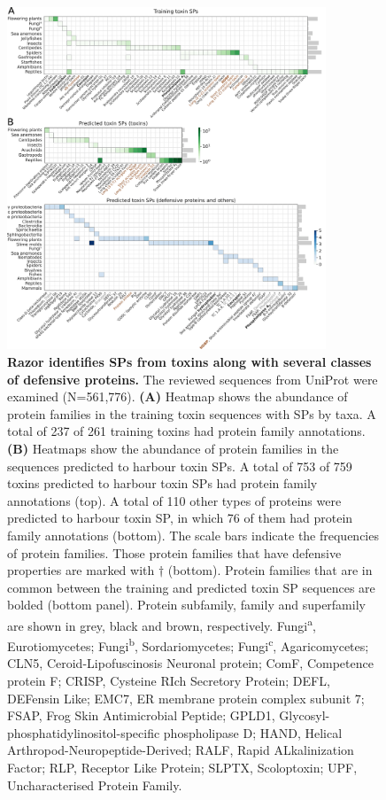 \begin{figure}[!hbtp]
\centerline{\includegraphics[width=0.85\textwidth]{chapters/Signal_Peptide/Figures/fig4_tox.png}}
\caption[Razor identifies SPs from toxins along with several classes of defensive proteins.]{\textbf{Razor identifies SPs from toxins along with several classes of defensive proteins.} The reviewed sequences from UniProt were examined (N=561,776). \textbf{(A)} Heatmap shows the abundance of protein families in the training toxin sequences with SPs by taxa. A total of 237 of 261 training toxins had protein family annotations. \textbf{(B)} Heatmaps show the abundance of protein families in the sequences predicted to harbour toxin SPs. A total of 753 of 759 toxins predicted to harbour toxin SPs had protein family annotations (top). A total of 110 other types of proteins were predicted to harbour toxin SP, in which 76 of them had protein family annotations (bottom). The scale bars indicate the frequencies of protein families. Those protein families that have defensive properties are marked with $\dagger$ (bottom). Protein families that are in common between the training and predicted toxin SP sequences are bolded (bottom panel). Protein subfamily, family and superfamily are shown in grey, black and brown, respectively. Fungi\textsuperscript{a}, Eurotiomycetes; Fungi\textsuperscript{b}, Sordariomycetes; Fungi\textsuperscript{c}, Agaricomycetes; CLN5, Ceroid-Lipofuscinosis Neuronal protein; ComF, Competence protein F; CRISP, Cysteine RIch Secretory Protein; DEFL, DEFensin Like; EMC7, ER membrane protein complex subunit 7; FSAP, Frog Skin Antimicrobial Peptide; GPLD1, Glycosyl-phosphatidylinositol-specific phospholipase D; HAND, Helical Arthropod-Neuropeptide-Derived; RALF, Rapid ALkalinization Factor; RLP, Receptor Like Protein; SLPTX, Scoloptoxin; UPF, Uncharacterised Protein Family.
}\label{fig:razor_04}
\end{figure}

